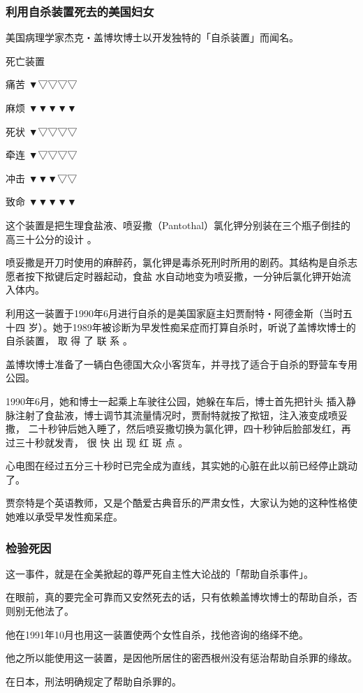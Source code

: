 \documentclass[UTF8]{ctexart}
\begin{document}
\subsubsection*{利用自杀装置死去的美国妇女}

美国病理学家杰克‧盖博坎博士以开发独特的「自杀装置」而闻名。

死亡装置

痛苦 ▼▽▽▽▽

麻烦 ▼▼▼▼▼

死状 ▼▽▽▽▽

牵连 ▼▽▽▽▽

冲击 ▼▼▼▽▽

致命 ▼▼▼▼▼

这个装置是把生理食盐液、喷妥撒（Pantothal）氯化钾分别装在三个瓶子倒挂的高三十公分的设计 。

喷妥撒是开刀时使用的麻醉药，氯化钾是毒杀死刑时所用的剧药。其结构是自杀志愿者按下揿键后定时器起动，食盐 水自动地变为喷妥撒，一分钟后氯化钾开始流入体内。

利用这一装置于1990年6月进行自杀的是美国家庭主妇贾耐特‧阿德金斯（当时五十四 岁）。她于1989年被诊断为早发性痴呆症而打算自杀时，听说了盖博坎博士的自杀装置， 取 得 了 联 系 。

盖博坎博士准备了一辆白色德国大众小客货车，并寻找了适合于自杀的野营车专用公园。

1990年6月，她和博士一起乘上车驶往公园，她躲在车后，博士首先把针头 插入静脉注射了食盐液，博士调节其流量情况时，贾耐特就按了揿钮，注入液变成喷妥撒， 二十秒钟后她入睡了，然后喷妥撒切换为氯化钾，四十秒钟后脸部发红，再过三十秒就发青， 很 快 出 现 红 斑 点 。

心电图在经过五分三十秒时已完全成为直线，其实她的心脏在此以前已经停止跳动了。

贾奈特是个英语教师，又是个酷爱古典音乐的严肃女性，大家认为她的这种性格使她难以承受早发性痴呆症。

\subsubsection*{检验死因}

这一事件，就是在全美掀起的尊严死自主性大论战的「帮助自杀事件」。

在眼前，真的要完全可靠而又安然死去的话，只有依赖盖博坎博士的帮助自杀，否则别无他法了。

他在1991年10月也用这一装置使两个女性自杀，找他咨询的络绎不绝。

他之所以能使用这一装置，是因他所居住的密西根州没有惩治帮助自杀罪的缘故。

在日本，刑法明确规定了帮助自杀罪的。
\end{document}
